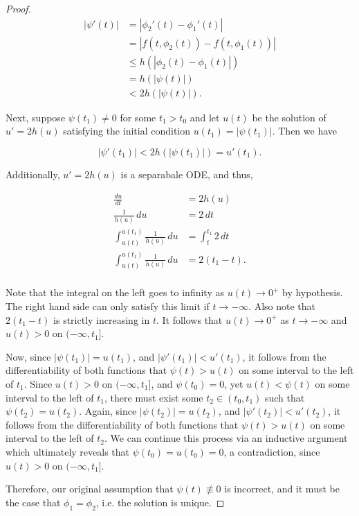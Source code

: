\documentclass[11pt,oneside,english]{amsart}
\theoremstyle{definition}
\newcommand{\dd}[2]{\frac{d{#1}}{d{#2}}}
\begin{document}
\begin{enumerate}
\begin{proof}
\vspace{-10mm}
\begin{align*}
|\psi'(t)|&=|\phi_2'(t)-\phi_1'(t)|\\[2mm]
&=|f(t,\phi_2(t))-f(t,\phi_1(t))|\\[2mm]
&\leq h(|\phi_2(t)-\phi_1(t)|)\\[2mm]
&=h(|\psi(t)|)\\[2mm]
&<2h(|\psi(t)|).
\end{align*}

Next, suppose $\psi(t_1)\neq0$ for some $t_1>t_0$ and let $u(t)$ be the solution of $u'=2h(u)$ satisfying the initial condition $u(t_1)=|\psi(t_1)|$. Then we have

\[
|\psi'(t_1)|<2h(|\psi(t_1)|)=u'(t_1).
\]

Additionally, $u'=2h(u)$ is a separabale ODE, and thus,

\vspace{-8mm}
\begin{align*}
\dd{u}{t}&=2h(u)\\[2mm]
\frac{1}{h(u)}\,du&=2\,dt\\[2mm]
\int_{u(t)}^{u(t_1)}\frac{1}{h(u)}\,du&=\int_t^{t_1}2\,dt\\[2mm]
\int_{u(t)}^{u(t_1)}\frac{1}{h(u)}\,du&=2(t_1-t).\\[2mm]
\end{align*}

Note that the integral on the left goes to infinity as $u(t)\rightarrow0^+$ by hypothesis. The right hand side can only satisfy this limit if $t\rightarrow-\infty$. Also note that $2(t_1-t)$ is strictly increasing in $t$. It follows that $u(t)\rightarrow0^+$ as $t\rightarrow-\infty$ and $u(t)>0$ on $(-\infty,t_1]$.

Now, since $|\psi(t_1)|=u(t_1)$, and $|\psi'(t_1)|<u'(t_1)$, it follows from the differentiability of both functions that $\psi(t)>u(t)$ on some interval to the left of $t_1$. Since $u(t)>0$ on $(-\infty,t_1]$, and $\psi(t_0)=0$, yet $u(t)<\psi(t)$ on some interval to the left of $t_1$, there must exist some $t_2\in(t_0,t_1)$ such that $\psi(t_2)=u(t_2)$. Again, since $|\psi(t_2)|=u(t_2)$, and $|\psi'(t_2)|<u'(t_2)$, it follows from the differentiability of both functions that $\psi(t)>u(t)$ on some interval to the left of $t_2$. We can continue this process via an inductive argument which ultimately reveals that $\psi(t_0)=u(t_0)=0$, a contradiction, since $u(t)>0$ on $(-\infty, t_1]$.

Therefore, our original assumption that $\psi(t)\not\equiv0$ is incorrect, and it must be the case that $\phi_1=\phi_2$, i.e. the solution is unique.
\end{proof}



\end{enumerate}
\end{document}
